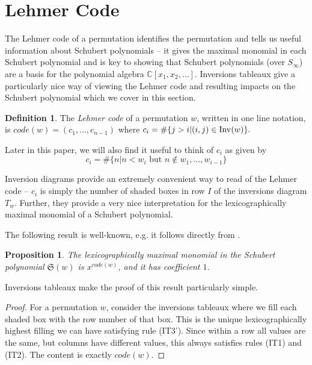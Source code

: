 \documentclass{article}
\newtheorem{proposition}[theorem]{Proposition}
\theoremstyle{definition}
\newtheorem{definition}[theorem]{Definition} %
\begin{document}
\section{Lehmer Code}
\label{section:lehmer code}

The Lehmer code of a permutation identifies the permutation and tells us useful information about Schubert polynomials -- it gives the maximal monomial in each Schubert polynomial and is key to showing that Schubert polynomials (over $S_{\infty}$) are a basis for the polynomial algebra $\mathbb{C}[x_1,x_2, \dots ]$. Inversions tableaux give a particularly nice way of viewing the Lehmer code and resulting impacts on the Schubert polynomial which we cover in this section.


\begin{definition}
    The \emph{Lehmer code} of a permutation $w$, written in one line notation, is $code(w) = (c_1, \dots, c_{n-1})$ where $c_i = \#\{ j > i | (i,j) \in \mathrm{Inv}(w) \}.$
\end{definition}
Later in this paper, we will also find it useful to think of $c_i$ as given by
$$c_i = \#\{n | n < w_i \text{ but } n \notin w_1, \dots ,w_{i-1}\}$$

Inversion diagrams provide an extremely convenient way to read of the Lehmer code -- $c_i$ is simply the number of shaded boxes in row $I$ of the inversions diagram $T_w$. Further, they provide a very nice interpretation for the lexicographically maximal monomial of a Schubert polynomial. 

The following result is well-known, e.g. it follows directly from \cite[Theorem 3.7]{bergeron1993rc}.

\begin{proposition}
  The lexicographically maximal monomial in the Schubert polynomial $\mathfrak{S}(w)$ is $x^{code(w)}$, and it has coefficient $1$.
\end{proposition}

Inversions tableaux make the proof of this result particularly simple.

\begin{proof}
    For a permutation $w$, consider the inversions tableaux where we fill each shaded box with the row number of that box. This is the unique lexicographically highest filling we can have satisfying rule (IT3'). Since within a row all values are the same, but columns have different values, this always satisfies rules (IT1) and (IT2). The content is exactly $code(w)$.
\end{proof}
\end{document}
